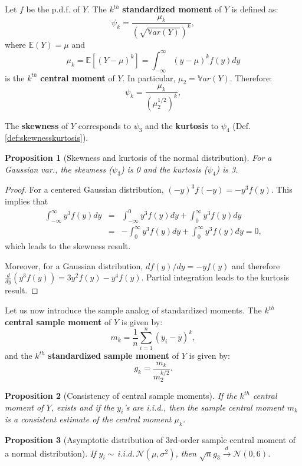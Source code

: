\documentclass[
  12pt,
]{book}
\newtheorem{proposition}{Proposition}[chapter]
\theoremstyle{definition}
\theoremstyle{definition}
\theoremstyle{definition}
\theoremstyle{definition}
\theoremstyle{remark}
\begin{document}
Let \(f\) be the p.d.f. of \(Y\). The \(k^{th}\) \textbf{standardized moment} of \(Y\) is defined as:
\[
\psi_k = \frac{\mu_k}{\left(\sqrt{\mathbb{V}ar(Y)}\right)^k},
\]
where \(\mathbb{E}(Y)=\mu\) and
\[
\mu_k = \mathbb{E}[(Y-\mu)^k]= \int_{-\infty}^{\infty} (y-\mu)^k f(y) dy
\]
is the \(k^{th}\) \textbf{central moment} of \(Y\). In particular, \(\mu_2 = \mathbb{V}ar(Y)\). Therefore:
\[
\psi_k = \frac{\mu_k}{\left(\mu_2^{1/2}\right)^k},
\]

The \textbf{skewness} of \(Y\) corresponds to \(\psi_3\) and the \textbf{kurtosis} to \(\psi_4\) (Def. \ref{def:skewnesskurtosis}).

\begin{proposition}[Skewness and kurtosis of the normal distribution]
\protect\hypertarget{prp:normSkewKurt}{}\label{prp:normSkewKurt}For a Gaussian var., the skewness (\(\psi_3\)) is 0 and the kurtosis (\(\psi_4\)) is 3.
\end{proposition}

\begin{proof}
For a centered Gaussian distribution, \((-y)^3f(-y)=-y^3f(y)\). This implies that
\begin{eqnarray*}
\int_{-\infty}^{\infty}y^3f(y)dy&=&\int_{-\infty}^{0}y^3f(y)dy+\int_{0}^{\infty}y^3f(y)dy\\
&=&-\int_{0}^{\infty}y^3f(y)dy+\int_{0}^{\infty}y^3f(y)dy=0,
\end{eqnarray*}
which leads to the skewness result.

Moreover, for a Gaussian distribution, \(df(y)/dy=-yf(y)\) and therefore \(\frac{d}{dy}(y^3f(y))=3y^2f(y)-y^4f(y)\). Partial integration leads to the kurtosis result.
\end{proof}

Let us now introduce the sample analog of standardized moments. The \(k^{th}\) \textbf{central sample moment} of \(Y\) is given by:
\[
m_k = \frac{1}{n}\sum_{i=1}^n(y_i - \bar{y})^k,
\]
and the \(k^{th}\) \textbf{standardized sample moment} of \(Y\) is given by:
\[
g_k = \frac{m_k}{m_2^{k/2}}.
\]

\begin{proposition}[Consistency of central sample moments]
\protect\hypertarget{prp:conssitCentralMoments}{}\label{prp:conssitCentralMoments}If the \(k^{th}\) central moment of \(Y\), exists and if the \(y_i\)'s are i.i.d., then the sample central moment \(m_k\) is a consistent estimate of the central moment \(\mu_k\).
\end{proposition}

\begin{proposition}[Asymptotic distribution of 3rd-order sample central moment of a normal distribution]
\protect\hypertarget{prp:Asymptg3Normal}{}\label{prp:Asymptg3Normal}If \(y_i\sim\,i.i.d.\,\mathcal{N}(\mu,\sigma^2)\), then \(\sqrt{n}g_3 \overset{d}{\rightarrow} \mathcal{N}(0,6)\).
\end{proposition}
\end{document}
